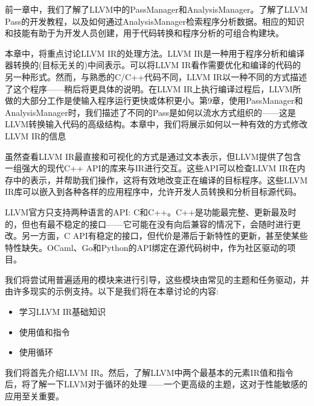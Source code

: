 前一章中，我们了解了LLVM中的PassManager和AnalysisManager。了解了LLVM Pass的开发教程，以及如何通过AnalysisManager检索程序分析数据。相应的知识和技能有助于为开发人员创建，用于代码转换和程序分析的可组合构建块。

本章中，将重点讨论LLVM IR的处理方法。LLVM IR是一种用于程序分析和编译器转换的(目标无关的)中间表示。可以将LLVM IR看作需要优化和编译的代码的另一种形式。然而，与熟悉的C/C++代码不同，LLVM IR以一种不同的方式描述了这个程序——稍后将更具体的说明。在LLVM IR上执行编译过程后，LLVM所做的大部分工作是使输入程序运行更快或体积更小。第9章，使用PassManager和AnalysisManager时，我们描述了不同的Pass是如何以流水方式组织的——这是LLVM转换输入代码的高级结构。本章中，我们将展示如何以一种有效的方式修改LLVM IR的信息

虽然查看LLVM IR最直接和可视化的方式是通过文本表示，但LLVM提供了包含一组强大的现代C++ API的库来与IR进行交互。这些API可以检查LLVM IR在内存中的表示，并帮助我们操作，这将有效地改变正在编译的目标程序。这些LLVM IR库可以嵌入到各种各样的应用程序中，允许开发人员转换和分析目标源代码。

\begin{tcolorbox}[colback=blue!5!white,colframe=blue!75!black, fonttitle=\bfseries,title=适用于不同编程语言的LLVM API]	
\hspace*{0.7cm}LLVM官方只支持两种语言的API: C和C++。C++是功能最完整、更新最及时的，但也有最不稳定的接口——它可能在没有向后兼容的情况下，会随时进行更改。另一方面，C API有稳定的接口，但代价是滞后于新特性的更新，甚至使某些特性缺失。OCaml、Go和Python的API绑定在源代码树中，作为社区驱动的项目。
\end{tcolorbox}

我们将尝试用普遍适用的模块来进行引导，这些模块由常见的主题和任务驱动，并由许多现实的示例支持。以下是我们将在本章讨论的内容:

\begin{itemize}
\item 学习LLVM IR基础知识
\item 使用值和指令
\item 使用循环
\end{itemize}

我们将首先介绍LLVM IR。然后，了解LLVM中两个最基本的元素IR值和指令后，将了解一下LLVM对于循环的处理——一个更高级的主题，这对于性能敏感的应用至关重要。
























